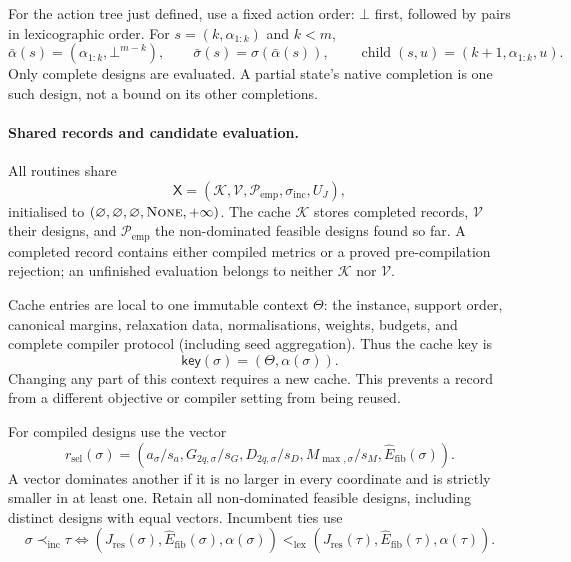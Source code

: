 \documentclass[a4paper,onecolumn,11pt,unpublished]{quantumarticle}
\theoremstyle{remark}
\begin{document}
For the action tree just defined, use a fixed
action order: $\bot$ first, followed by pairs in lexicographic order.
For $s=(k,\alpha_{1:k})$ and $k<m$,
\begin{equation}
\bar\alpha(s)=(\alpha_{1:k},\bot^{m-k}),\qquad
\bar\sigma(s)=\sigma(\bar\alpha(s)),\qquad
\operatorname{child}(s,u)=(k+1,\alpha_{1:k},u).
\label{eq:app-state-completion}
\end{equation}
Only complete designs are evaluated.  A partial state's native completion
is one such design, not a bound on its other completions.

\paragraph{Shared records and candidate evaluation.}
All routines share
\begin{equation}
\mathsf X=(\mathcal K,\mathcal V,\mathcal P_{\mathrm{emp}},\sigma_{\mathrm{inc}},U_J),
\label{eq:app-shared-search-state}
\end{equation}
initialised to $(\varnothing,\varnothing,\varnothing,\textsc{None},+\infty)$.
The cache $\mathcal K$ stores completed records, $\mathcal V$ their designs,
and $\mathcal P_{\mathrm{emp}}$ the non-dominated feasible designs found so far.
A completed record contains either compiled metrics or a proved
pre-compilation rejection; an unfinished evaluation belongs to neither
$\mathcal K$ nor $\mathcal V$.

Cache entries are local to one immutable context $\Theta$: the instance,
support order, canonical margins, relaxation data, normalisations, weights,
budgets, and complete compiler protocol (including seed aggregation).
Thus the cache key is
\begin{equation}
\mathsf{key}(\sigma)=(\Theta,\alpha(\sigma)).
\label{eq:appendix-cache-key}
\end{equation}
Changing any part of this context requires a new cache.  This prevents a
record from a different objective or compiler setting from being reused.

For compiled designs use the vector
\begin{equation}
r_{\mathrm{sel}}(\sigma)=
(a_\sigma/s_a,G_{2q,\sigma}/s_G,D_{2q,\sigma}/s_D,
M_{\max,\sigma}/s_M,\widehat E_{\mathrm{fib}}(\sigma)).
\label{eq:app-pareto-vector}
\end{equation}
A vector dominates another if it is no larger in every coordinate and is
strictly smaller in at least one.  Retain all non-dominated feasible designs,
including distinct designs with equal vectors.  Incumbent ties use
\begin{equation}
\sigma\prec_{\mathrm{inc}}\tau
\iff (J_{\mathrm{res}}(\sigma),\widehat E_{\mathrm{fib}}(\sigma),\alpha(\sigma))
<_{\mathrm{lex}}
(J_{\mathrm{res}}(\tau),\widehat E_{\mathrm{fib}}(\tau),\alpha(\tau)).
\label{eq:app-incumbent-order}
\end{equation}
\end{document}
